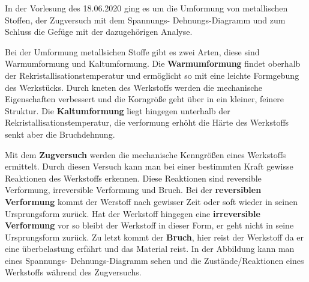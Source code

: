 \documentclass[12pt]{scrreprt}
\begin{document}
In der Vorlesung des 18.06.2020 ging es um die Umformung von metallischen Stoffen, der Zugversuch mit dem Spannungs- Dehnungs-Diagramm und zum Schluss die Gefüge mit der dazugehörigen Analyse.\par\vspace{5pt}
Bei der Umformung metallsichen Stoffe gibt es zwei Arten, diese sind Warmumformung und Kaltumformung. 
Die \textbf{Warmumformung} findet oberhalb der Rekristallisationstemperatur und ermöglicht so mit eine leichte Formgebung des Werkstücks. Durch kneten des Werkstoffs werden die mechanische Eigenschaften verbessert und die Korngröße geht über in ein kleiner, feinere Struktur.
Die \textbf{Kaltumformung} liegt hingegen unterhalb der Rekristallisationstemperatur, die verformung erhöht die Härte des Werkstoffs senkt aber die Bruchdehnung.\par\vspace{5pt}
Mit dem \textbf{Zugversuch} werden die mechanische Kenngrößen eines Werkstoffs ermittelt. Durch diesen Versuch kann man bei einer bestimmten Kraft gewisse Reaktionen des Werkstoffs erkennen.
Diese Reaktionen sind reversible Verformung, irreversible Verformung und Bruch.
Bei der \textbf{reversiblen Verformung} kommt der Werstoff nach gewisser Zeit oder soft wieder in seinen Ursprungsform zurück. 
Hat der Werkstoff hingegen eine \textbf{irreversible Verformung} vor so bleibt der Werkstoff in dieser Form, er geht nicht in seine Ursprungsform zurück.
Zu letzt kommt der \textbf{Bruch}, hier reist der Werkstoff da er eine überbelastung erfährt und das Material reist. In der Abbildung kann man eines Spannungs- Dehnungs-Diagramm sehen und die Zustände/Reaktionen eines Werkstoffs während des Zugversuchs.\par\vspace*{10pt}
\vspace*{-5mm}
\end{document}

